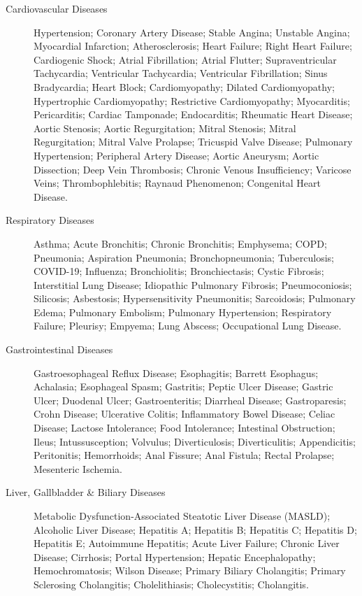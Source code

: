 \medskip
\begin{description}
\item[Cardiovascular Diseases] Hypertension; Coronary Artery Disease; Stable Angina; Unstable Angina; Myocardial Infarction; Atherosclerosis; Heart Failure; Right Heart Failure; Cardiogenic Shock; Atrial Fibrillation; Atrial Flutter; Supraventricular Tachycardia; Ventricular Tachycardia; Ventricular Fibrillation; Sinus Bradycardia; Heart Block; Cardiomyopathy; Dilated Cardiomyopathy; Hypertrophic Cardiomyopathy; Restrictive Cardiomyopathy; Myocarditis; Pericarditis; Cardiac Tamponade; Endocarditis; Rheumatic Heart Disease; Aortic Stenosis; Aortic Regurgitation; Mitral Stenosis; Mitral Regurgitation; Mitral Valve Prolapse; Tricuspid Valve Disease; Pulmonary Hypertension; Peripheral Artery Disease; Aortic Aneurysm; Aortic Dissection; Deep Vein Thrombosis; Chronic Venous Insufficiency; Varicose Veins; Thrombophlebitis; Raynaud Phenomenon; Congenital Heart Disease.
%
\item[Respiratory Diseases] Asthma; Acute Bronchitis; Chronic Bronchitis; Emphysema; COPD; Pneumonia; Aspiration Pneumonia; Bronchopneumonia; Tuberculosis; COVID-19; Influenza; Bronchiolitis; Bronchiectasis; Cystic Fibrosis; Interstitial Lung Disease; Idiopathic Pulmonary Fibrosis; Pneumoconiosis; Silicosis; Asbestosis; Hypersensitivity Pneumonitis; Sarcoidosis; Pulmonary Edema; Pulmonary Embolism; Pulmonary Hypertension; Respiratory Failure; Pleurisy; Empyema; Lung Abscess; Occupational Lung Disease.
%
\item[Gastrointestinal Diseases] Gastroesophageal Reflux Disease; Esophagitis; Barrett Esophagus; Achalasia; Esophageal Spasm; Gastritis; Peptic Ulcer Disease; Gastric Ulcer; Duodenal Ulcer; Gastroenteritis; Diarrheal Disease; Gastroparesis; Crohn Disease; Ulcerative Colitis; Inflammatory Bowel Disease; Celiac Disease; Lactose Intolerance; Food Intolerance; Intestinal Obstruction; Ileus; Intussusception; Volvulus; Diverticulosis; Diverticulitis; Appendicitis; Peritonitis; Hemorrhoids; Anal Fissure; Anal Fistula; Rectal Prolapse; Mesenteric Ischemia.
%
\item[Liver, Gallbladder \& Biliary Diseases] Metabolic Dysfunction-Associated Steatotic Liver Disease (MASLD); Alcoholic Liver Disease; Hepatitis A; Hepatitis B; Hepatitis C; Hepatitis D; Hepatitis E; Autoimmune Hepatitis; Acute Liver Failure; Chronic Liver Disease; Cirrhosis; Portal Hypertension; Hepatic Encephalopathy; Hemochromatosis; Wilson Disease; Primary Biliary Cholangitis; Primary Sclerosing Cholangitis; Cholelithiasis; Cholecystitis; Cholangitis.

\end{description}
